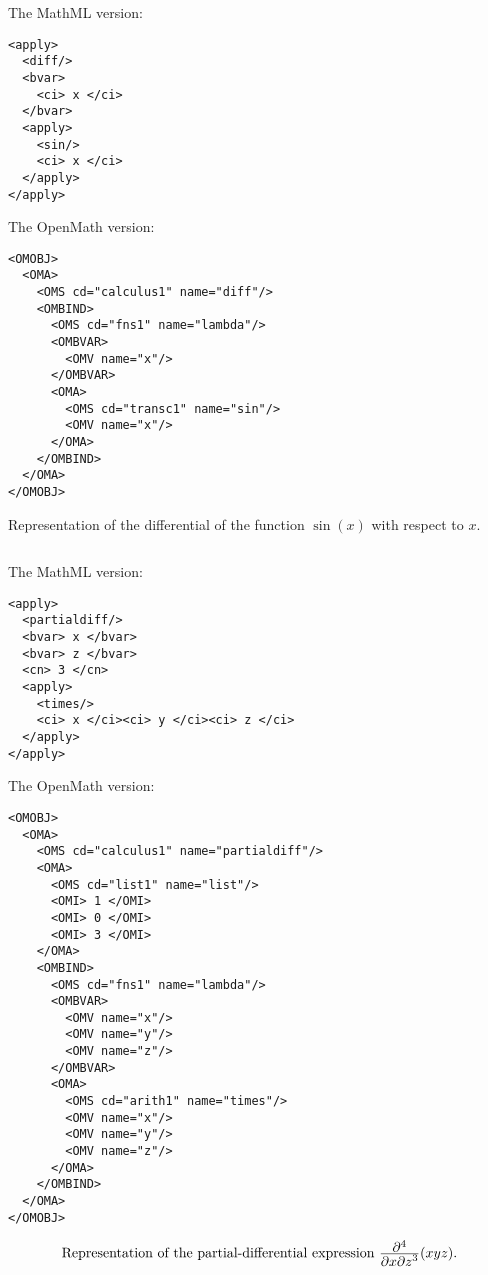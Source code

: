 \documentclass[twoside,11pt]{article}
\newcommand{\T}{\textstyle}
\begin{document}
\begin{center}
\begin{mybox}{4.5in}
The MathML version:
\begin{verbatim}
<apply>
  <diff/>
  <bvar>
    <ci> x </ci>
  </bvar>
  <apply>
    <sin/>
    <ci> x </ci>
  </apply>
</apply>
\end{verbatim}

The OpenMath version:
\begin{verbatim}
<OMOBJ>
  <OMA>
    <OMS cd="calculus1" name="diff"/>
    <OMBIND>
      <OMS cd="fns1" name="lambda"/>
      <OMBVAR>
        <OMV name="x"/>
      </OMBVAR>
      <OMA>
        <OMS cd="transc1" name="sin"/>
        <OMV name="x"/>
      </OMA>
    </OMBIND>
  </OMA>
</OMOBJ>
\end{verbatim}
\end{mybox}
\end{center}
\begin{center}
Representation of the differential of the function $\sin(x)$ with
respect to $x$.
\end{center}
\begin{equation}\label{diff}
\end{equation}

\begin{center}
\begin{mybox}{4.5in}
The MathML version:
\begin{verbatim}
<apply>
  <partialdiff/>
  <bvar> x </bvar>
  <bvar> z </bvar>
  <cn> 3 </cn>
  <apply>
    <times/>
    <ci> x </ci><ci> y </ci><ci> z </ci>
  </apply>
</apply>
\end{verbatim}

The OpenMath version:
\begin{verbatim}
<OMOBJ>
  <OMA>
    <OMS cd="calculus1" name="partialdiff"/>
    <OMA>
      <OMS cd="list1" name="list"/>
      <OMI> 1 </OMI>
      <OMI> 0 </OMI>
      <OMI> 3 </OMI>
    </OMA>
    <OMBIND>
      <OMS cd="fns1" name="lambda"/>
      <OMBVAR>
        <OMV name="x"/>
        <OMV name="y"/>
        <OMV name="z"/>
      </OMBVAR>
      <OMA>
        <OMS cd="arith1" name="times"/>
        <OMV name="x"/>
        <OMV name="y"/>
        <OMV name="z"/>
      </OMA>
    </OMBIND>
  </OMA>
</OMOBJ>
\end{verbatim}
\end{mybox}
\end{center}
\begin{equation}\label{partialdiff}
\hbox{Representation of the partial-differential expression
$\frac{\T \partial^4}{\T \partial x\partial z^3}(xyz)$.}
\end{equation}
\end{document}
